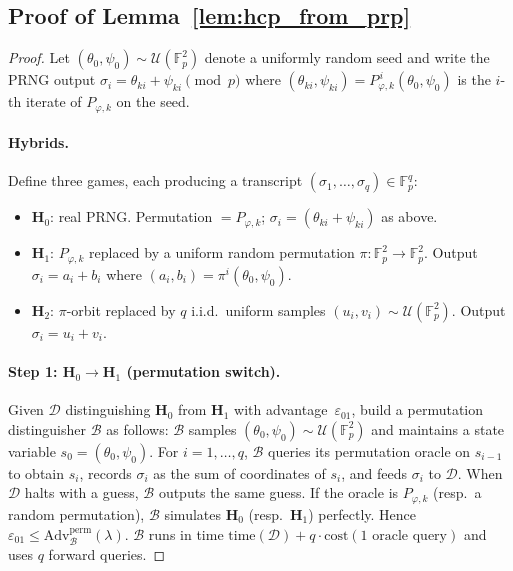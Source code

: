 \documentclass[11pt,a4paper]{article}
\theoremstyle{definition}
\newcommand{\Fp}{\mathbb{F}_p}
\begin{document}
\subsection*{Proof of Lemma~\ref{lem:hcp_from_prp}}\label{app:hcp_proof}

\begin{proof}
Let $(\theta_0,\psi_0)\sim\mathcal U(\Fp^{2})$ denote a uniformly random
seed and write the PRNG output $\sigma_i=\theta_{ki}+\psi_{ki}\pmod p$
where $(\theta_{ki},\psi_{ki})=P_{\varphi,k}^{\,i}(\theta_0,\psi_0)$ is
the $i$-th iterate of $P_{\varphi,k}$ on the seed.

\paragraph{Hybrids.}
Define three games, each producing a transcript
$(\sigma_1,\dots,\sigma_q)\in\Fp^{q}$:
\begin{itemize}[nosep]
  \item $\mathbf{H}_{0}$: real PRNG. Permutation $=P_{\varphi,k}$;
        $\sigma_i=(\theta_{ki}+\psi_{ki})$ as above.
  \item $\mathbf{H}_{1}$: $P_{\varphi,k}$ replaced by a uniform random
        permutation $\pi\!:\!\Fp^{2}\!\to\!\Fp^{2}$. Output
        $\sigma_i=a_i+b_i$ where $(a_i,b_i)=\pi^{i}(\theta_0,\psi_0)$.
  \item $\mathbf{H}_{2}$: $\pi$-orbit replaced by $q$ i.i.d.\ uniform
        samples $(u_i,v_i)\sim\mathcal U(\Fp^{2})$. Output
        $\sigma_i=u_i+v_i$.
\end{itemize}

\paragraph{Step 1: $\mathbf{H}_0\!\to\!\mathbf{H}_1$ (permutation switch).}
Given $\mathcal D$ distinguishing $\mathbf{H}_0$ from $\mathbf{H}_1$
with advantage~$\varepsilon_{01}$, build a permutation distinguisher
$\mathcal B$ as follows: $\mathcal B$ samples
$(\theta_0,\psi_0)\!\sim\!\mathcal U(\Fp^{2})$ and maintains a state
variable $s_0=(\theta_0,\psi_0)$.  For
$i=1,\dots,q$, $\mathcal B$ queries its permutation oracle on $s_{i-1}$ to
obtain $s_i$, records $\sigma_i$ as the sum of coordinates of $s_i$,
and feeds $\sigma_i$ to $\mathcal D$.  When $\mathcal D$ halts with a
guess, $\mathcal B$ outputs the same guess. If the oracle is
$P_{\varphi,k}$ (resp.\ a random permutation), $\mathcal B$ simulates
$\mathbf{H}_0$ (resp.\ $\mathbf{H}_1$) perfectly. Hence
$\varepsilon_{01}\le\mathrm{Adv}^{\mathrm{perm}}_{\mathcal B}(\lambda)$.
$\mathcal B$ runs in time $\mathrm{time}(\mathcal D)+q\cdot
\mathrm{cost}(\text{1 oracle query})$ and uses $q$ forward queries.


\end{proof}
\end{document}
